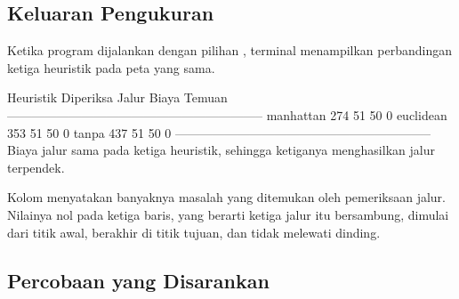 \subsection{Keluaran Pengukuran}

Ketika program dijalankan dengan pilihan , terminal
menampilkan perbandingan ketiga heuristik pada peta yang sama.

\begin{kodekeluaran}
  Heuristik  Diperiksa   Jalur   Biaya  Temuan
--------------------------------------------------------------
  manhattan        274      51      50       0
  euclidean        353      51      50       0
      tanpa        437      51      50       0
--------------------------------------------------------------
Biaya jalur sama pada ketiga heuristik, sehingga ketiganya
menghasilkan jalur terpendek.
\end{kodekeluaran}

Kolom  menyatakan banyaknya masalah yang ditemukan oleh
pemeriksaan jalur. Nilainya nol pada ketiga baris, yang berarti ketiga jalur
itu bersambung, dimulai dari titik awal, berakhir di titik tujuan, dan tidak
melewati dinding.

\subsection{Percobaan yang Disarankan}

